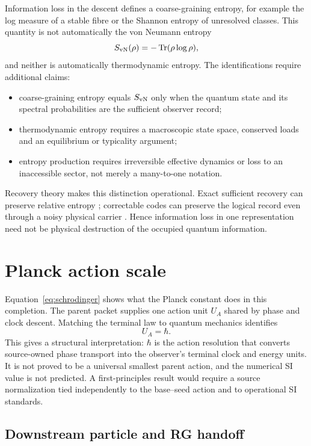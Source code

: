 \documentclass[11pt]{article}
\newcommand{\Tr}{\operatorname{Tr}}
\begin{document}
Information loss in the descent defines a coarse-graining entropy, for example
the log measure of a stable fibre or the Shannon entropy of unresolved classes.
This quantity is not automatically the von Neumann entropy
\begin{equation}
 S_{\rm vN}(\rho)=-\Tr(\rho\log\rho),
\end{equation}
and neither is automatically thermodynamic entropy.  The identifications
require additional claims:
\begin{itemize}
\item coarse-graining entropy equals $S_{\rm vN}$ only when the quantum state
and its spectral probabilities are the sufficient observer record;
\item thermodynamic entropy requires a macroscopic state space, conserved
loads and an equilibrium or typicality argument;
\item entropy production requires irreversible effective dynamics or loss to
an inaccessible sector, not merely a many-to-one notation.
\end{itemize}
Recovery theory makes this distinction operational.  Exact sufficient
recovery can preserve relative entropy \citep{Petz1986}; correctable codes can
preserve the logical record even through a noisy physical carrier
\citep{KnillLaflamme1997}.  Hence information loss in one representation need
not be physical destruction of the occupied quantum information.

\section{Planck action scale}

Equation~\eqref{eq:schrodinger} shows what the Planck constant does in this
completion.  The parent packet supplies one action unit $U_A$ shared by phase
and clock descent.  Matching the terminal law to quantum mechanics identifies
\begin{equation}
 U_A=\hbar.
\end{equation}
This gives a structural interpretation: $\hbar$ is the action resolution that
converts source-owned phase transport into the observer's terminal clock and
energy units.  It is not proved to be a universal smallest parent action, and
the numerical SI value is not predicted.  A first-principles result would
require a source normalization tied independently to the base--seed action and
to operational SI standards.

\subsection{Downstream particle and RG handoff}
\end{document}
